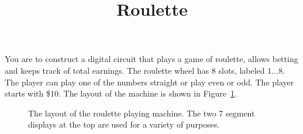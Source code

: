 \documentclass{article}[10 pt,landscape]
\begin{document}
\newcommand{\bs}{\backslash}

\title{Roulette}

You are to construct a digital circuit that plays a game of
roulette, allows betting and keeps track of total earnings.
The roulette wheel has 8 slots, labeled $1 \ldots 8$.  The player
can play one of the numbers straight or play even or odd.
The player starts with \$10. 
The layout of the machine is shown in Figure~\ref{fig:Roulette}.
\begin{figure}[ht]
\caption{The layout of the roulette playing machine.  
The two 7 segment displays at the top are used for a variety
of purposes.}
\label{fig:Roulette}
\end{figure}
\end{document}
